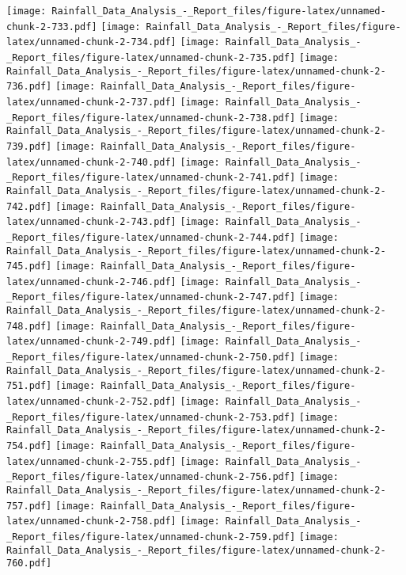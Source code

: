 \documentclass[
]{article}
\begin{document}
\texttt{[image: Rainfall\_Data\_Analysis\_-\_Report\_files/figure-latex/unnamed-chunk-2-733.pdf]}
\texttt{[image: Rainfall\_Data\_Analysis\_-\_Report\_files/figure-latex/unnamed-chunk-2-734.pdf]}
\texttt{[image: Rainfall\_Data\_Analysis\_-\_Report\_files/figure-latex/unnamed-chunk-2-735.pdf]}
\texttt{[image: Rainfall\_Data\_Analysis\_-\_Report\_files/figure-latex/unnamed-chunk-2-736.pdf]}
\texttt{[image: Rainfall\_Data\_Analysis\_-\_Report\_files/figure-latex/unnamed-chunk-2-737.pdf]}
\texttt{[image: Rainfall\_Data\_Analysis\_-\_Report\_files/figure-latex/unnamed-chunk-2-738.pdf]}
\texttt{[image: Rainfall\_Data\_Analysis\_-\_Report\_files/figure-latex/unnamed-chunk-2-739.pdf]}
\texttt{[image: Rainfall\_Data\_Analysis\_-\_Report\_files/figure-latex/unnamed-chunk-2-740.pdf]}
\texttt{[image: Rainfall\_Data\_Analysis\_-\_Report\_files/figure-latex/unnamed-chunk-2-741.pdf]}
\texttt{[image: Rainfall\_Data\_Analysis\_-\_Report\_files/figure-latex/unnamed-chunk-2-742.pdf]}
\texttt{[image: Rainfall\_Data\_Analysis\_-\_Report\_files/figure-latex/unnamed-chunk-2-743.pdf]}
\texttt{[image: Rainfall\_Data\_Analysis\_-\_Report\_files/figure-latex/unnamed-chunk-2-744.pdf]}
\texttt{[image: Rainfall\_Data\_Analysis\_-\_Report\_files/figure-latex/unnamed-chunk-2-745.pdf]}
\texttt{[image: Rainfall\_Data\_Analysis\_-\_Report\_files/figure-latex/unnamed-chunk-2-746.pdf]}
\texttt{[image: Rainfall\_Data\_Analysis\_-\_Report\_files/figure-latex/unnamed-chunk-2-747.pdf]}
\texttt{[image: Rainfall\_Data\_Analysis\_-\_Report\_files/figure-latex/unnamed-chunk-2-748.pdf]}
\texttt{[image: Rainfall\_Data\_Analysis\_-\_Report\_files/figure-latex/unnamed-chunk-2-749.pdf]}
\texttt{[image: Rainfall\_Data\_Analysis\_-\_Report\_files/figure-latex/unnamed-chunk-2-750.pdf]}
\texttt{[image: Rainfall\_Data\_Analysis\_-\_Report\_files/figure-latex/unnamed-chunk-2-751.pdf]}
\texttt{[image: Rainfall\_Data\_Analysis\_-\_Report\_files/figure-latex/unnamed-chunk-2-752.pdf]}
\texttt{[image: Rainfall\_Data\_Analysis\_-\_Report\_files/figure-latex/unnamed-chunk-2-753.pdf]}
\texttt{[image: Rainfall\_Data\_Analysis\_-\_Report\_files/figure-latex/unnamed-chunk-2-754.pdf]}
\texttt{[image: Rainfall\_Data\_Analysis\_-\_Report\_files/figure-latex/unnamed-chunk-2-755.pdf]}
\texttt{[image: Rainfall\_Data\_Analysis\_-\_Report\_files/figure-latex/unnamed-chunk-2-756.pdf]}
\texttt{[image: Rainfall\_Data\_Analysis\_-\_Report\_files/figure-latex/unnamed-chunk-2-757.pdf]}
\texttt{[image: Rainfall\_Data\_Analysis\_-\_Report\_files/figure-latex/unnamed-chunk-2-758.pdf]}
\texttt{[image: Rainfall\_Data\_Analysis\_-\_Report\_files/figure-latex/unnamed-chunk-2-759.pdf]}
\texttt{[image: Rainfall\_Data\_Analysis\_-\_Report\_files/figure-latex/unnamed-chunk-2-760.pdf]}
\end{document}
